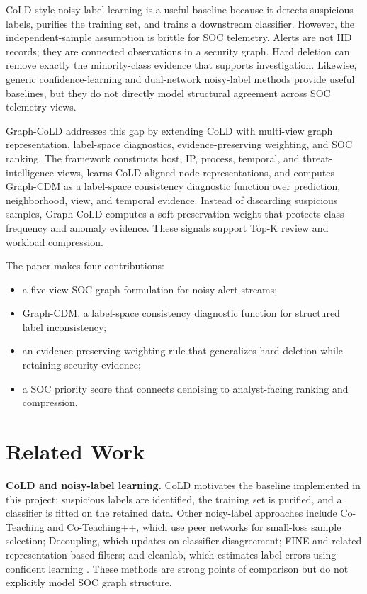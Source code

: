 \documentclass[preprint,12pt]{elsarticle}
\begin{document}
CoLD-style noisy-label learning is a useful baseline because it detects suspicious labels, purifies the training set, and trains a downstream classifier. However, the independent-sample assumption is brittle for SOC telemetry. Alerts are not IID records; they are connected observations in a security graph. Hard deletion can remove exactly the minority-class evidence that supports investigation. Likewise, generic confidence-learning and dual-network noisy-label methods provide useful baselines, but they do not directly model structural agreement across SOC telemetry views.

Graph-CoLD addresses this gap by extending CoLD with multi-view graph representation, label-space diagnostics, evidence-preserving weighting, and SOC ranking. The framework constructs host, IP, process, temporal, and threat-intelligence views, learns CoLD-aligned node representations, and computes Graph-CDM as a label-space consistency diagnostic function over prediction, neighborhood, view, and temporal evidence. Instead of discarding suspicious samples, Graph-CoLD computes a soft preservation weight that protects class-frequency and anomaly evidence. These signals support Top-K review and workload compression.

The paper makes four contributions:
\begin{itemize}
    \item a five-view SOC graph formulation for noisy alert streams;
    \item Graph-CDM, a label-space consistency diagnostic function for structured label inconsistency;
    \item an evidence-preserving weighting rule that generalizes hard deletion while retaining security evidence;
    \item a SOC priority score that connects denoising to analyst-facing ranking and compression.
\end{itemize}

\section{Related Work}
\textbf{CoLD and noisy-label learning.}
CoLD motivates the baseline implemented in this project: suspicious labels are identified, the training set is purified, and a classifier is fitted on the retained data. Other noisy-label approaches include Co-Teaching and Co-Teaching++, which use peer networks for small-loss sample selection; Decoupling, which updates on classifier disagreement; FINE and related representation-based filters; and cleanlab, which estimates label errors using confident learning \citep{han2018coteaching,malach2017decoupling,northcutt2021confident}. These methods are strong points of comparison but do not explicitly model SOC graph structure.
\end{document}
